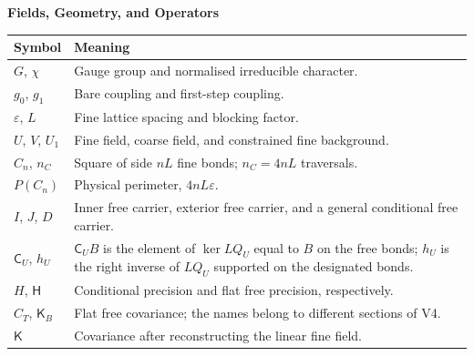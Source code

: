 \documentclass[11pt,a4paper]{article}
\newcommand{\subhead}[1]{\par\vspace{4pt}\textbf{\color{ink}#1}\par}
\begin{document}
\subhead{Fields, Geometry, and Operators}
\begin{small}
    \begin{tabularx}{\textwidth}{@{}p{}X@{}}
        \toprule
        \textbf{Symbol} & \textbf{Meaning}\\
        \midrule
        $G$, $\chi$ & Gauge group and normalised irreducible character.\\[3pt]
        $g_0$, $g_1$ & Bare coupling and first-step coupling.\\[3pt]
        $\varepsilon$, $L$ & Fine lattice spacing and blocking factor.\\[3pt]
        $U$, $V$, $U_1$ & Fine field, coarse field, and constrained fine background.\\[3pt]
        $C_n$, $n_C$ & Square of side $nL$ fine bonds; $n_C=4nL$ traversals.\\[3pt]
        $P(C_n)$ & Physical perimeter, $4nL\varepsilon$.\\[3pt]
        $I$, $J$, $D$ & Inner free carrier, exterior free carrier, and a general conditional free carrier.\\[3pt]
        $\mathsf C_U$, $h_U$ & $\mathsf C_UB$ is the element of $\ker LQ_U$ equal to $B$ on the free bonds; $h_U$ is the right inverse of $LQ_U$ supported on the designated bonds.\\[3pt]
        $H$, $\mathsf H$ & Conditional precision and flat free precision, respectively.\\[3pt]
        $C_T$, $\mathsf K_B$ & Flat free covariance; the names belong to different sections of V4.\\[3pt]
        $\mathsf K$ & Covariance after reconstructing the linear fine field.\\
        \bottomrule
    \end{tabularx}
\end{small}
\end{document}
